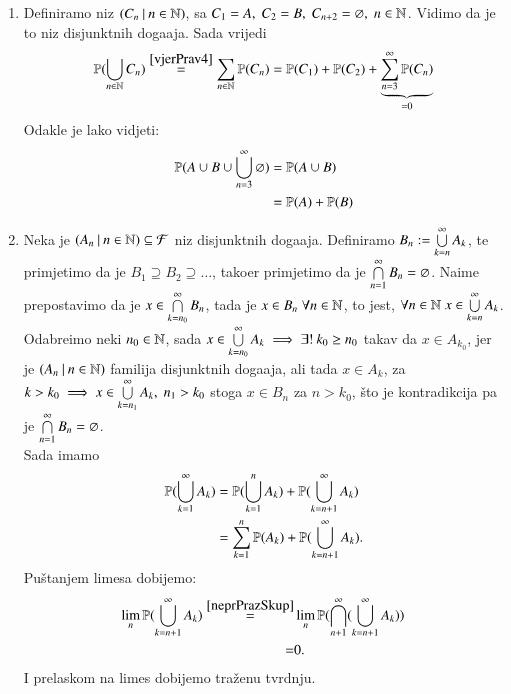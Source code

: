 \begin{rj}
    \begin{enumerate}[label=(\alph*)]
        \item Definiramo niz $(C_n \: | \: n \in \mathbb{N})$, sa $C_1 = A,
            \; C_2 = B, \; C_{n + 2} = \varnothing, \; n \in \mathbb{N}$.
            Vidimo da je to niz disjunktnih doga\dj aja.
            Sada vrijedi
            \begin{equation*}
                \mathbb{P}({\bigcup\limits_{n \in \mathbb{N}}^{} C_n})
                \overset{\eqref{vjerPrav4}}{=} \sum\limits_{n \in \mathbb{N}}^{}
                \mathbb{P}({C_n}) = \mathbb{P}({C_1}) + \mathbb{P}({C_2})
                + \underbrace{\sum\limits_{n = 3}^{\infty} \mathbb{P}({C_n})}_{=0}
            \end{equation*}
            Odakle je lako vidjeti:
            \begin{align*}
                \mathbb{P}({A \cup B \cup \bigcup\limits_{n = 3}^{\infty}
                \varnothing}) &= \mathbb{P}({A \cup B}) \\
                &= \mathbb{P}({A}) + \mathbb{P}({B})
            \end{align*}
        \item Neka je $({A_n} \: | \: {n \in \mathbb{N}}) \subseteq \mathcal{F}$ niz
            disjunktnih doga\dj aja. Definiramo $B_n :=
            \bigcup\limits_{k = n}^{\infty} A_k$, te primjetimo da je
            $B_1 \supseteq B_2 \supseteq \dots$, tako\dj er
            primjetimo da je $\bigcap\limits_{n = 1}^{\infty} B_n =
            \varnothing$. Naime prepostavimo da je $x \in
            \bigcap\limits_{k = n_0}^{\infty} B_n$, tada je $x \in B_n
            \; \forall n \in \mathbb{N}$, to jest, $ \forall n \in \mathbb{N} \;
            x \in \bigcup\limits_{k = n}^{\infty} A_k$.
            Odabreimo neki $n_0 \in \mathbb{N}$, sada $x \in
            \bigcup\limits_{k = n_0}^{\infty} A_k \implies \exists ! \: k_0
            \geq n_0$ takav da $x \in A_{k_0}$, jer je
            $({A_n} \: | \: {n \in \mathbb{N}})$ familija disjunktnih doga\dj aja,
            ali tada $x \in A_k$, za $k > k_0 \implies x  \in
            \bigcup\limits_{k = n_1}^{\infty} A_k, \; n_1 > k_0$ stoga
            $x \in B_n$ za $n > k_0$, \v sto je kontradikcija pa je
            $\bigcap\limits_{n = 1}^{\infty} B_n = \varnothing$.\\
            Sada imamo
            \begin{align*}
                \mathbb{P}({\bigcup\limits_{k = 1}^{\infty} A_k})
                &= \mathbb{P}({\bigcup\limits_{k = 1}^{n} A_k})
                + \mathbb{P}({\bigcup\limits_{k = n + 1}^{\infty} A_k}) \\
                &= \sum\limits_{k = 1}^{n} \mathbb{P}({A_k})
                + \mathbb{P}({\bigcup\limits_{k = n + 1}^{\infty} A_k}). 
            \end{align*}
            Pu\v stanjem limesa dobijemo:
            \begin{align*}
                \lim_n \mathbb{P}({\bigcup\limits_{k = n + 1}^{\infty} A_k})
                \overset{\eqref{neprPrazSkup}}{=}& \lim_n
                \mathbb{P}({\bigcap\limits_{n + 1}^{\infty}(
                    \bigcup\limits_{k = n + 1}^{\infty} A_k)})\\
                =& 0.
            \end{align*}
            I prelaskom na limes dobijemo tra\v zenu tvrdnju.
    \end{enumerate}
\end{rj}

